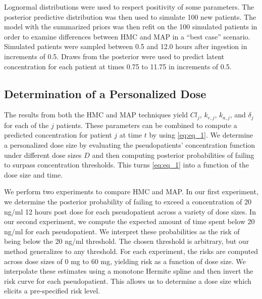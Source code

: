 \noindent Lognormal distributions were used to respect positivity of some parameters.   The posterior predictive distribution was then used to simulate 100 new patients.  The model with the summarized priors was then refit on the 100 simulated patients in order to examine differences between HMC and MAP in a “best case” scenario. Simulated patients were sampled between 0.5 and 12.0 hours after ingestion in increments of 0.5. Draws from the posterior were used to predict latent concentration for each patient at times 0.75 to 11.75 in increments of 0.5.

\subsection*{Determination of a Personalized Dose}

The results from both the HMC and MAP techniques yield $Cl_{j}$, $k_{e,j}$, $k_{a,j}$, and $\delta_j$ for each of the $j$ patients.  These parameters can be combined to compute a predicted concentration for patient $j$ at time $t$ by using \cref{eq:eq_1}.   We determine a personalized dose size by evaluating the pseudopatients’ concentration function under different dose sizes $D$ and then computing posterior probabilities of failing to surpass concentration thresholds.  This turns \cref{eq:eq_1} into a function of the dose size and time. 


We perform two experiments to compare HMC and MAP.  In our first experiment, we determine the posterior probability of failing to exceed a concentration of 20 ng/ml 12 hours post dose for each pseudopatient across a variety of dose sizes. In our second experiment, we compute the expected amount of time spent below 20 ng/ml for each pseudopatient.  We interpret these probabilities as the risk of being below the 20 ng/ml threshold.  The chosen threshold is arbitrary, but our method generalizes to any threshold.  For each experiment, the risks are computed across dose sizes of 0 mg to 60 mg, yielding risk as a function of dose size.  We interpolate these estimates using a monotone Hermite spline and then invert the risk curve for each pseudopatient.  This allows us to determine a dose size which elicits a pre-specified risk level.
